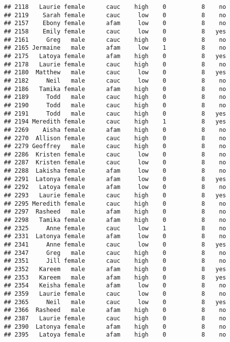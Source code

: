 \documentclass[
]{article}
\begin{document}
\begin{verbatim}
## 2118   Laurie female      cauc    high    0          8    no
## 2119    Sarah female      cauc     low    0          8    no
## 2157    Ebony female      afam     low    0          8    no
## 2158    Emily female      cauc     low    0          8   yes
## 2161     Greg   male      cauc    high    0          8    no
## 2165 Jermaine   male      afam     low    1          8    no
## 2175   Latoya female      afam    high    0          8   yes
## 2178   Laurie female      cauc    high    0          8    no
## 2180  Matthew   male      cauc     low    0          8   yes
## 2182     Neil   male      cauc     low    0          8    no
## 2186   Tamika female      afam    high    0          8    no
## 2189     Todd   male      cauc    high    0          8    no
## 2190     Todd   male      cauc    high    0          8    no
## 2191     Todd   male      cauc    high    0          8   yes
## 2194 Meredith female      cauc    high    1          8   yes
## 2269    Aisha female      afam    high    0          8    no
## 2270  Allison female      cauc    high    0          8    no
## 2279 Geoffrey   male      cauc    high    0          8    no
## 2286  Kristen female      cauc     low    0          8    no
## 2287  Kristen female      cauc     low    0          8    no
## 2288  Lakisha female      afam     low    0          8    no
## 2291  Latonya female      afam     low    0          8   yes
## 2292   Latoya female      afam     low    0          8    no
## 2293   Laurie female      cauc    high    0          8   yes
## 2295 Meredith female      cauc    high    0          8    no
## 2297  Rasheed   male      afam    high    0          8    no
## 2298   Tamika female      afam    high    0          8    no
## 2325     Anne female      cauc     low    1          8    no
## 2331  Latonya female      afam     low    0          8    no
## 2341     Anne female      cauc     low    0          8   yes
## 2347     Greg   male      cauc    high    0          8    no
## 2351     Jill female      cauc    high    0          8    no
## 2352   Kareem   male      afam    high    0          8   yes
## 2353   Kareem   male      afam    high    0          8   yes
## 2354   Keisha female      afam     low    0          8    no
## 2359   Laurie female      cauc     low    0          8    no
## 2365     Neil   male      cauc     low    0          8   yes
## 2366  Rasheed   male      afam    high    0          8    no
## 2387   Laurie female      cauc    high    0          8    no
## 2390  Latonya female      afam    high    0          8    no
## 2395   Latoya female      afam    high    0          8    no

\end{verbatim}
\end{document}

